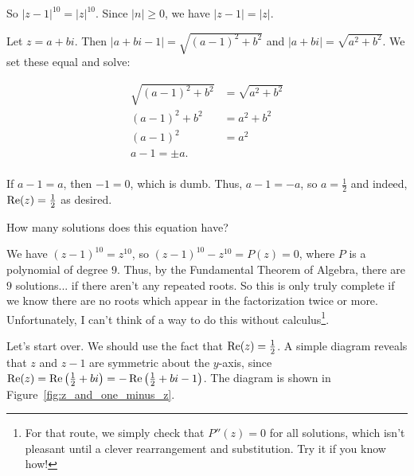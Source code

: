 \documentclass[../key.tex]{subfiles}
\begin{document}
So $|z-1|^{10}=|z|^{10}$. Since $|n|\geq 0$, we have $|z-1|=|z|$.

Let $z=a+bi$. Then $|a+bi-1|=\sqrt{(a-1)^2+b^2}$ and $|a+bi|=\sqrt{a^2+b^2}$. We set these equal and solve:

\begin{align*}
\sqrt{(a-1)^2+b^2} &= \sqrt{a^2+b^2} \\
(a-1)^2 + b^2 &= a^2 + b^2 \\
(a-1)^2 &= a^2 \\
a-1 = \pm a. \\
\end{align*}

If $a-1=a$, then $-1=0$, which is dumb. Thus, $a-1=-a$, so $a=\frac{1}{2}$ and indeed, $\operatorname{Re}(z) = \frac{1}{2}$ as desired.

\begin{inner_problem}
\item How many solutions does this equation have?
\end{inner_problem}

We have $(z-1)^{10}=z^{10}$, so $(z-1)^{10}-z^{10} = P(z) = 0$, where $P$ is a polynomial of degree $9$. Thus, by the Fundamental Theorem of Algebra, there are $9$ solutions... if there aren't any repeated roots. So this is only truly complete if we know there are no roots which appear in the factorization twice or more. Unfortunately, I can't think of a way to do this without calculus\footnote{For that route, we simply check that $P''(z)=0$ for all solutions, which isn't pleasant until a clever rearrangement and substitution. Try it if you know how!}.

Let's start over. We should use the fact that $\operatorname{Re}(z)=\frac{1}{2}$. A simple diagram reveals that $z$ and $z-1$ are symmetric about the $y$-axis, since $\operatorname{Re}(z) = \operatorname{Re}\left(\frac{1}{2}+bi\right) = -\operatorname{Re}\left(\frac{1}{2}+bi-1\right)$. The diagram is shown in Figure~\ref{fig:z_and_one_minus_z}.
\end{document}
